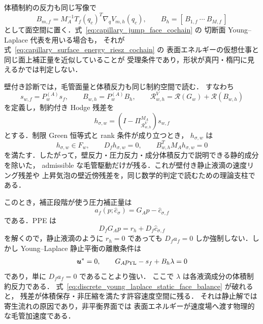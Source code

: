 体積制約の反力も同じ写像で
\begin{equation}
  B_{m,f}
  =
  M_A^{-1}T_f(q_c)^{T}\nabla_qV_{m,h}(q_c),
  \qquad
  B_h=[\,B_{1,f}\ \cdots\ B_{M,f}\,]
  \label{eq:capillary_component_volume_reactions}
\end{equation}
として面空間に置く．式~\eqref{eq:capillary_jump_face_cochain} の
切断面 Young--Laplace 代表を用いる場合も，
それが式~\eqref{eq:capillary_surface_energy_riesz_cochain} の
表面エネルギーの仮想仕事と同じ面上補正量を近似していることが
受理条件であり，形状が真円・楕円に見えるかでは判定しない．

壁付き診断では，毛管面量と体積反力も同じ制約空間で読む．
すなわち
\begin{equation}
  s_{w,f}=P_w^{(A)}s_f,\qquad
  B_{w,h}=P_w^{(A)}B_h,\qquad
  \mathcal{R}^{V}_{w,h}
  =
  \mathcal{R}(G_w)+\mathcal{R}(B_{w,h})
  \label{eq:constrained_capillary_reaction_space}
\end{equation}
を定義し，制約付き Hodge 残差を
\begin{equation}
  h_{\sigma,w}
  =
  \left(I-\Pi_{\mathcal{R}^{V}_{w,h}}^{M_A}\right)s_{w,f}
  \label{eq:constrained_capillary_hodge_residual}
\end{equation}
とする．制限 Green 恒等式と rank 条件が成り立つとき，
$h_{\sigma,w}$ は
\[
  h_{\sigma,w}\in F_w,\qquad
  D_fh_{\sigma,w}=0,\qquad
  B_{w,h}^TM_Ah_{\sigma,w}=0
\]
を満たす．したがって，壁反力・圧力反力・成分体積反力で説明できる静的成分を除いた，
admissible な毛管駆動だけが残る．これが壁付き静止液滴の速度リング残差や
上昇気泡の壁近傍残差を，同じ数学的判定で読むための理論支柱である．

このとき，補正段階が使う圧力補正量は
\begin{equation}
  a_f(p;\widehat c_\sigma) = G_Ap-\widehat c_{\sigma,f}
  \label{eq:capillary_pressure_face_cochain}
\end{equation}
である．PPE は
\begin{equation}
  D_fG_Ap = r_h + D_f\widehat c_{\sigma,f}
  \label{eq:capillary_affine_ppe_general}
\end{equation}
を解くので，静止液滴のように $r_h=0$ であっても
$D_fa_f=0$ しか強制しない．しかし Young--Laplace 静止平衡の離散条件は
\begin{equation}
  \bm{u}^\ast=0,\qquad
  G_Ap_{\mathrm{YL}}-s_f+B_h\lambda=0
  \label{eq:discrete_young_laplace_static_face_balance}
\end{equation}
であり，単に $D_fa_f=0$ であることより強い．
ここで $\lambda$ は各液滴成分の体積制約反力である．
式~\eqref{eq:discrete_young_laplace_static_face_balance} が破れると，
残差が体積保存・非圧縮を満たす許容速度空間に残る．
それは静止解では寄生流れの原因であり，非平衡界面では
表面エネルギーが速度場へ渡す物理的な毛管加速度である．

